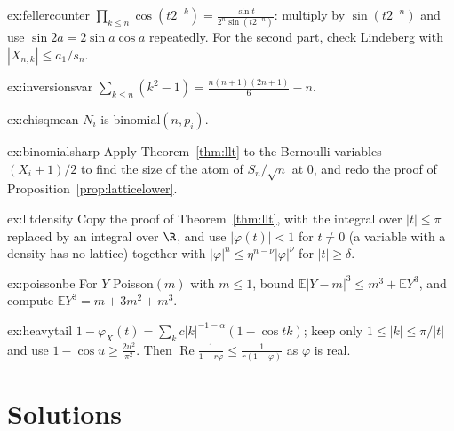 \begin{hint}{ex:fellercounter}
$\prod_{k\le n}\cos(t2^{-k})=\frac{\sin t}{2^n\sin(t2^{-n})}$: multiply by $\sin(t2^{-n})$ and use $\sin2a=2\sin a\cos a$ repeatedly. For the second part, check Lindeberg with $|X_{n,k}|\le a_1/s_n$.
\end{hint}
\begin{hint}{ex:inversionsvar}
$\sum_{k\le n}(k^2-1)=\frac{n(n+1)(2n+1)}6-n$.
\end{hint}
\begin{hint}{ex:chisqmean}
$N_i$ is binomial$(n,p_i)$.
\end{hint}
\begin{hint}{ex:binomialsharp}
Apply Theorem~\ref{thm:llt} to the Bernoulli variables $(X_i+1)/2$ to find the size of the atom of $S_n/\sqrt n$ at $0$, and redo the proof of
Proposition~\ref{prop:latticelower}.
\end{hint}
\begin{hint}{ex:lltdensity}
Copy the proof of Theorem~\ref{thm:llt}, with the integral over $|t|\le\pi$ replaced by an integral over $\R$, and use $|\varphi(t)|<1$ for $t\ne0$
(a variable with a density has no lattice) together with $|\varphi|^n\le\eta^{n-\nu}|\varphi|^\nu$ for $|t|\ge\delta$.
\end{hint}
\begin{hint}{ex:poissonbe}
For $Y$ Poisson$(m)$ with $m\le1$, bound $\mathbb E|Y-m|^3\le m^3+\mathbb EY^3$, and compute $\mathbb EY^3=m+3m^2+m^3$.
\end{hint}
\begin{hint}{ex:heavytail}
$1-\varphi_X(t)=\sum_kc|k|^{-1-\alpha}(1-\cos tk)$; keep only $1\le|k|\le\pi/|t|$ and use $1-\cos u\ge\frac{2u^2}{\pi^2}$. Then $\operatorname{Re}\frac1{1-r\varphi}\le\frac1{r(1-\varphi)}$
as $\varphi$ is real.
\end{hint}

\section{Solutions}


